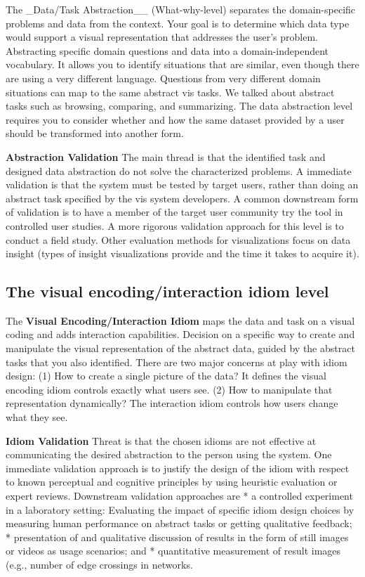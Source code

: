 \documentclass[
]{book}
\begin{document}
The \_Data/Task Abstraction\_\_ (What-why-level) separates the domain-specific problems and data from the context.
Your goal is to determine which data type would support a visual representation that addresses the user's problem.
Abstracting specific domain questions and data into a domain-independent vocabulary. It allows you to identify situations that are similar, even though there are using a very different language.
Questions from very different domain situations can map to the same abstract vis tasks. We talked about abstract tasks such as browsing, comparing, and summarizing. The data abstraction level requires you to consider whether and how the same dataset provided by a user should be transformed into another form.

\textbf{Abstraction Validation}
The main thread is that the identified task and designed data abstraction do not solve the characterized problems.
A immediate validation is that the system must be tested by target users, rather than doing an abstract task specified by the vis system developers.
A common downstream form of validation is to have a member of the target user community try the tool in controlled user studies. A more rigorous validation approach for this level is to conduct a field study.
Other evaluation methods for visualizations focus on data insight (types of insight visualizations provide and the time it takes to acquire it).

\hypertarget{the-visual-encodinginteraction-idiom-level}{%
\subsection{The visual encoding/interaction idiom level}\label{the-visual-encodinginteraction-idiom-level}}

The \textbf{Visual Encoding/Interaction Idiom} maps the data and task on a visual coding and adds interaction capabilities.
Decision on a specific way to create and manipulate the visual representation of the abstract data, guided by the abstract tasks that you also identified. There are two major concerns at play with idiom design: (1) How to create a single picture of the data? It defines the visual encoding idiom controls exactly what users see. (2) How to manipulate that representation dynamically? The interaction idiom controls how users change what they see.

\textbf{Idiom Validation}
Threat is that the chosen idioms are not effective at communicating the desired abstraction to the person using the system.
One immediate validation approach is to justify the design of the idiom with respect to known perceptual and cognitive principles by using heuristic evaluation or expert reviews. Downstream validation approaches are
* a controlled experiment in a laboratory setting: Evaluating the impact of specific idiom design choices by measuring human performance on abstract tasks or getting qualitative feedback;
* presentation of and qualitative discussion of results in the form of still images or videos as usage scenarios; and
* quantitative measurement of result images (e.g., number of edge crossings in networks.
\end{document}
